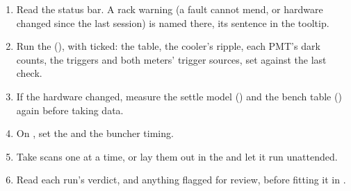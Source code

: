\begin{enumerate}
    \item Read the status bar. A rack warning (a fault \oracle{} cannot mend, or hardware
        changed since the last session) is named there, its sentence in the tooltip.
    \item Run the  (), with  ticked: the table, the cooler's ripple, each PMT's dark counts, the
        triggers and both meters' trigger sources, set against the last check.
    \item If the hardware changed, measure the settle model () and the
        bench table () again before taking data.
    \item On , set the  and the buncher timing.
    \item Take scans one at a time, or lay them out in the  and let it run
        unattended.
    \item Read each run's  verdict, and anything flagged for review,
        before fitting it in \denis{}.
\end{enumerate}
